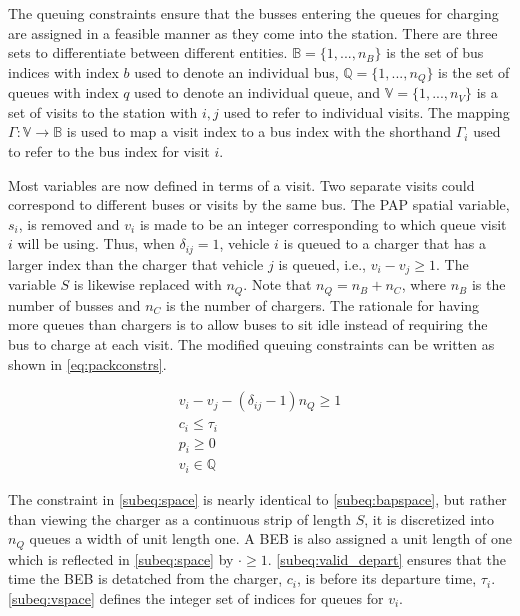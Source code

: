 \documentclass[11pt,a4paper,final]{article}
\begin{document}
\noindent
The queuing constraints ensure that the busses entering the queues for charging are assigned in a feasible manner as
they come into the station. There are three sets to differentiate between different entities. \(\mathbb{B} = \{1, ...,
n_B\}\) is the set of bus indices with index \(b\) used to denote an individual bus, \(\mathbb{Q} = \{1, ..., n_Q\}\) is the set of
queues with index \(q\) used to denote an individual queue, and \(\mathbb{V} = \{1, ..., n_V\}\) is a set of visits to the
station with \(i,j\) used to refer to individual visits. The mapping \(\Gamma: \mathbb{V} \rightarrow \mathbb{B}\) is used to map a visit
index to a bus index with the shorthand \(\Gamma_i\) used to refer to the bus index for visit \(i\).

Most variables are now defined in terms of a visit. Two separate visits could correspond to different buses or visits by
the same bus. The PAP spatial variable, \(s_i\), is removed and \(v_i\) is made to be an integer corresponding to which
queue visit \(i\) will be using. Thus, when \(\delta_{ij} = 1\), vehicle \(i\) is queued to a charger that has a larger index than
the charger that vehicle \(j\) is queued, i.e., \(v_i-v_j \geq 1\). The variable \(S\) is likewise replaced with \(n_Q\). Note that
\(n_Q = n_B + n_C\), where \(n_B\) is the number of busses and \(n_C\) is the number of chargers. The rationale for having
more queues than chargers is to allow buses to sit idle instead of requiring the bus to charge at each visit. The
modified queuing constraints can be written as shown in \autoref{eq:packconstrs}.

\begin{subequations}
\label{eq:packconstrs}
\begin{align}
    v_i - v_j - (\delta_{ij} - 1)n_Q \geq 1       \label{subeq:space}        \\
    c_i \leq \tau_i                             \label{subeq:valid_depart} \\
    p_i \geq 0                               \label{subeq:pos_charge} \\
    v_i \in \mathbb{Q}                       \label{subeq:vspace}
\end{align}
\end{subequations}

The constraint in \autoref{subeq:space} is nearly identical to \autoref{subeq:bapspace}, but rather than viewing the
charger as a continuous strip of length \(S\), it is discretized into \(n_Q\) queues a width of unit length one. A BEB is
also assigned a unit length of one which is reflected in \autoref{subeq:space} by \(\cdot \geq 1\). \autoref{subeq:valid_depart}
ensures that the time the BEB is detatched from the charger, \(c_i\), is before its departure time, \(\tau_i\).
\autoref{subeq:vspace} defines the integer set of indices for queues for \(v_i\).
\end{document}
